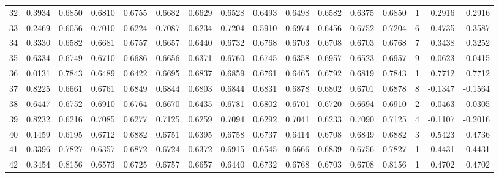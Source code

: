 \begin{tabular}{lrrrrrrrrrrrrrrr}
32  &      0.3934 &  0.6850 &  0.6810 &  0.6755 &  0.6682 &  0.6629 &  0.6528 &  0.6493 &  0.6498 &  0.6582 &   0.6375 &     0.6850 &      1 &                    0.2916 &                     0.2916 \\
33  &      0.2469 &  0.6056 &  0.7010 &  0.6224 &  0.7087 &  0.6234 &  0.7204 &  0.5910 &  0.6974 &  0.6456 &   0.6752 &     0.7204 &      6 &                    0.4735 &                     0.3587 \\
34  &      0.3330 &  0.6582 &  0.6681 &  0.6757 &  0.6657 &  0.6440 &  0.6732 &  0.6768 &  0.6703 &  0.6708 &   0.6703 &     0.6768 &      7 &                    0.3438 &                     0.3252 \\
35  &      0.6334 &  0.6749 &  0.6710 &  0.6686 &  0.6656 &  0.6371 &  0.6760 &  0.6745 &  0.6358 &  0.6957 &   0.6523 &     0.6957 &      9 &                    0.0623 &                     0.0415 \\
36  &      0.0131 &  0.7843 &  0.6489 &  0.6422 &  0.6695 &  0.6837 &  0.6859 &  0.6761 &  0.6465 &  0.6792 &   0.6819 &     0.7843 &      1 &                    0.7712 &                     0.7712 \\
37  &      0.8225 &  0.6661 &  0.6761 &  0.6849 &  0.6844 &  0.6803 &  0.6844 &  0.6831 &  0.6878 &  0.6802 &   0.6701 &     0.6878 &      8 &                   -0.1347 &                    -0.1564 \\
38  &      0.6447 &  0.6752 &  0.6910 &  0.6764 &  0.6670 &  0.6435 &  0.6781 &  0.6802 &  0.6701 &  0.6720 &   0.6694 &     0.6910 &      2 &                    0.0463 &                     0.0305 \\
39  &      0.8232 &  0.6216 &  0.7085 &  0.6277 &  0.7125 &  0.6259 &  0.7094 &  0.6292 &  0.7041 &  0.6233 &   0.7090 &     0.7125 &      4 &                   -0.1107 &                    -0.2016 \\
40  &      0.1459 &  0.6195 &  0.6712 &  0.6882 &  0.6751 &  0.6395 &  0.6758 &  0.6737 &  0.6414 &  0.6708 &   0.6849 &     0.6882 &      3 &                    0.5423 &                     0.4736 \\
41  &      0.3396 &  0.7827 &  0.6357 &  0.6872 &  0.6724 &  0.6372 &  0.6915 &  0.6545 &  0.6666 &  0.6839 &   0.6756 &     0.7827 &      1 &                    0.4431 &                     0.4431 \\
42  &      0.3454 &  0.8156 &  0.6573 &  0.6725 &  0.6757 &  0.6657 &  0.6440 &  0.6732 &  0.6768 &  0.6703 &   0.6708 &     0.8156 &      1 &                    0.4702 &                     0.4702 \\

\end{tabular}
